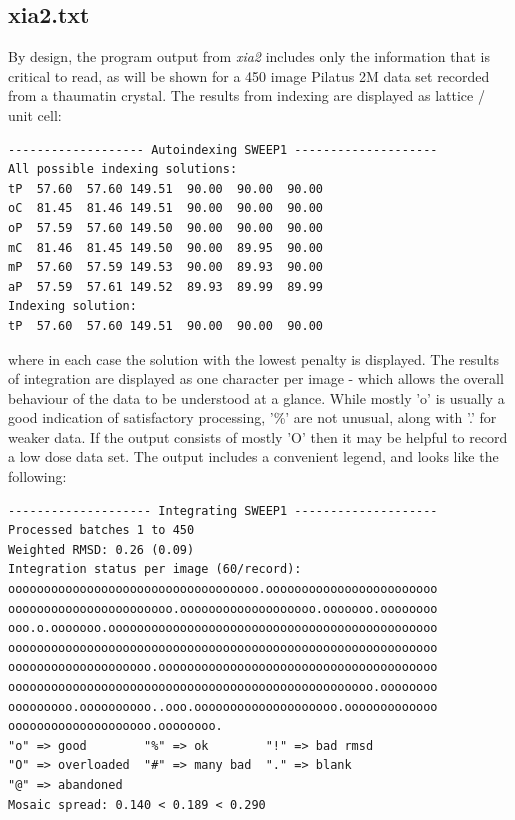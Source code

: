 \documentclass[a4paper, 11pt]{article}
\begin{document}
\subsection{xia2.txt}

By design, the program output from \emph{xia2} includes only
the information that is critical to read, as will be shown for a 450 image 
Pilatus 2M data set recorded from a thaumatin crystal. The results from 
indexing are displayed as lattice / unit cell:

{\small
\begin{verbatim}
------------------- Autoindexing SWEEP1 --------------------
All possible indexing solutions:
tP  57.60  57.60 149.51  90.00  90.00  90.00
oC  81.45  81.46 149.51  90.00  90.00  90.00
oP  57.59  57.60 149.50  90.00  90.00  90.00
mC  81.46  81.45 149.50  90.00  89.95  90.00
mP  57.60  57.59 149.53  90.00  89.93  90.00
aP  57.59  57.61 149.52  89.93  89.99  89.99
Indexing solution:
tP  57.60  57.60 149.51  90.00  90.00  90.00
\end{verbatim}
}

\noindent
where in each case the solution with the lowest penalty is displayed. The 
results of integration are displayed as one character per image - which 
allows the overall behaviour of the data to be understood at a glance. While
mostly 'o' is usually a good indication of satisfactory processing, '\%'
are not unusual, along with '.' for weaker data. If the output consists
of mostly 'O' then it may be helpful to record a low dose data set. The output
includes a convenient legend, and looks like the following:

{\small
\begin{verbatim}
-------------------- Integrating SWEEP1 --------------------
Processed batches 1 to 450
Weighted RMSD: 0.26 (0.09)
Integration status per image (60/record):
ooooooooooooooooooooooooooooooooooo.oooooooooooooooooooooooo
ooooooooooooooooooooooo.ooooooooooooooooooo.ooooooo.oooooooo
ooo.o.ooooooo.oooooooooooooooooooooooooooooooooooooooooooooo
oooooooooooooooooooooooooooooooooooooooooooooooooooooooooooo
oooooooooooooooooooo.ooooooooooooooooooooooooooooooooooooooo
ooooooooooooooooooooooooooooooooooooooooooooooooooo.oooooooo
ooooooooo.oooooooooo..ooo.oooooooooooooooooooo.ooooooooooooo
oooooooooooooooooooo.oooooooo.
"o" => good        "%" => ok        "!" => bad rmsd
"O" => overloaded  "#" => many bad  "." => blank
"@" => abandoned
Mosaic spread: 0.140 < 0.189 < 0.290
\end{verbatim}
}
\end{document}
